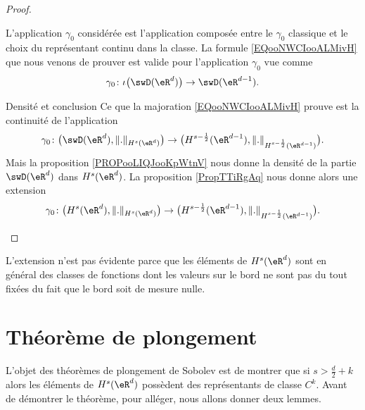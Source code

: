 \begin{proof}
\begin{subproof}
            L'application \( \gamma_0\) considérée est l'application composée entre le \( \gamma_0\) classique et le choix du représentant continu dans la classe. La formule \eqref{EQooNWCIooALMivH} que nous venons de prouver est valide pour l'application \( \gamma_0\) vue comme
            \begin{equation}
                \gamma_0\colon \iota\big( \swD(\eR^d) \big)\to \swD(\eR^{d-1}).
            \end{equation}
        \item[Densité et conclusion]
            Ce que la majoration \eqref{EQooNWCIooALMivH} prouve est la continuité de l'application
            \begin{equation}
                \gamma_0\colon \big( \swD(\eR^d),\| . \|_{H^s(\eR^d)} \big)\to \big( H^{s-\frac{ 1 }{2}}(\eR^{d-1}),\| . \|_{H^{s-\frac{ 1 }{2}}(\eR^{d-1})} \big).
            \end{equation}
            Mais la proposition \ref{PROPooLIQJooKpWtnV} nous donne la densité de la partie \( \swD(\eR^d)\) dans \( H^s(\eR^d)\). La proposition \ref{PropTTiRgAq} nous donne alors une extension
            \begin{equation}
                \gamma_0\colon \big(   H^s(\eR^d), \| . \|_{H^s(\eR^d)}   \big)\to \big( H^{s-\frac{ 1 }{2}}(\eR^{d-1}),\| . \|_{H^{s-\frac{ 1 }{2}}(\eR^{d-1})} \big).
            \end{equation}
    \end{subproof}
\end{proof}

\begin{remark}
    L'extension n'est pas évidente parce que les éléments de \( H^s(\eR^d)\) sont en général des classes de fonctions dont les valeurs sur le bord ne sont pas du tout fixées du fait que le bord soit de mesure nulle.
\end{remark}

\section{Théorème de plongement}

L'objet des théorèmes de plongement de Sobolev est de montrer que si \( s>\frac{ d }{ 2 }+k\) alors les éléments de \( H^s(\eR^d)\) possèdent des représentants de classe \( C^k\). Avant de démontrer le théorème, pour alléger, nous allons donner deux lemmes.

